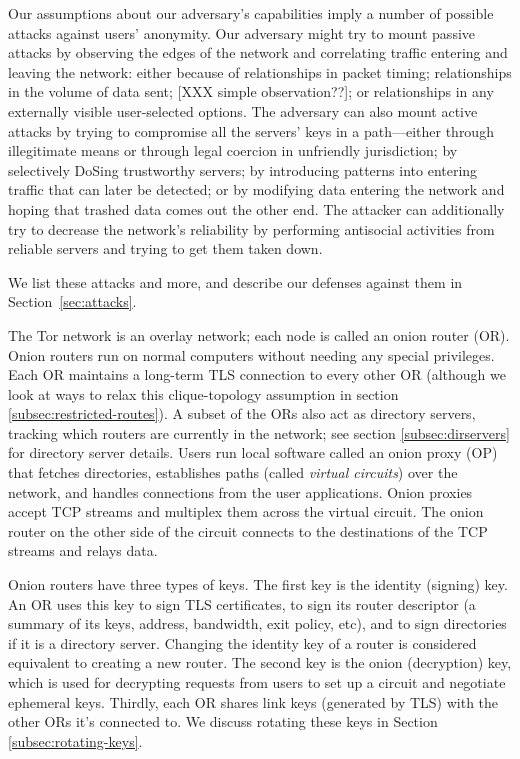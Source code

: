 \documentclass[times,10pt,twocolumn]{article}
\begin{document}
Our assumptions about our adversary's capabilities imply a number of
possible attacks against users' anonymity.  Our adversary might try to
mount passive attacks by observing the edges of the network and
correlating traffic entering and leaving the network: either because
of relationships in packet timing; relationships in the volume of data
sent; [XXX simple observation??]; or relationships in any externally
visible user-selected options.  The adversary can also mount active
attacks by trying to compromise all the servers' keys in a
path---either through illegitimate means or through legal coercion in
unfriendly jurisdiction; by selectively DoSing trustworthy servers; by
introducing patterns into entering traffic that can later be detected;
or by modifying data entering the network and hoping that trashed data
comes out the other end.  The attacker can additionally try to
decrease the network's reliability by performing antisocial activities
from reliable servers and trying to get them taken down.

We list these attacks and more, and describe our defenses against them
in Section~\ref{sec:attacks}.



\label{sec:design}

The Tor network is an overlay network; each node is called an onion router
(OR). Onion routers run on normal computers without needing any special
privileges. Each OR maintains a long-term TLS connection to every other
OR (although we look at ways to relax this clique-topology assumption in
section \ref{subsec:restricted-routes}). A subset of the ORs also act as
directory servers, tracking which routers are currently in the network;
see section \ref{subsec:dirservers} for directory server details. Users
run local software called an onion proxy (OP) that fetches directories,
establishes paths (called \emph{virtual circuits}) over the network,
and handles connections from the user applications. Onion proxies accept
TCP streams and multiplex them across the virtual circuit. The onion
router on the other side 
of the circuit connects to the destinations of
the TCP streams and relays data.

Onion routers have three types of keys. The first key is the identity
(signing) key. An OR uses this key to sign TLS certificates, to sign its
router descriptor (a summary of its keys, address, bandwidth, exit policy,
etc), and to sign directories if it is a directory server. Changing the
identity key of a router is considered equivalent to creating a new
router. The second key is the onion (decryption) key, which is used
for decrypting requests from users to set up a circuit and negotiate
ephemeral keys. Thirdly, each OR shares link keys (generated by TLS)
with the other ORs it's connected to. We discuss rotating these keys in
Section \ref{subsec:rotating-keys}.
\end{document}
